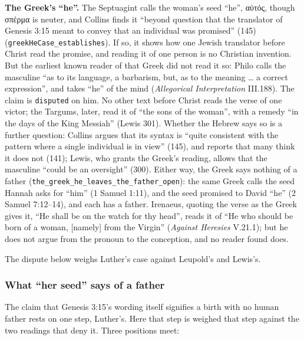 \documentclass[11pt]{article}
\begin{document}
\textbf{The Greek’s “he”.} The Septuagint calls the woman’s seed “he”, αὐτός, though σπέρμα is neuter, and Collins finds it “beyond question that the translator of Genesis 3:15 meant to convey that an individual was promised” (145) (\texttt{greek\allowbreak{}He\allowbreak{}Case\_\allowbreak{}establishes}). If so, it shows how one Jewish translator before Christ read the promise, and reading it of one person is no Christian invention. But the earliest known reader of that Greek did not read it so: Philo calls the masculine “as to its language, a barbarism, but, as to the meaning … a correct expression”, and takes “he” of the mind (\emph{Allegorical Interpretation} III.188). The claim is \texttt{disputed} on him. No other text before Christ reads the verse of one victor; the Targums, later, read it of “the sons of the woman”, with a remedy “in the days of the King Messiah” (Lewis 301). Whether the Hebrew says so is a further question: Collins argues that its syntax is “quite consistent with the pattern where a single individual is in view” (145), and reports that many think it does not (141); Lewis, who grants the Greek’s reading, allows that the masculine “could be an oversight” (300). Either way, the Greek says nothing of a father (\texttt{the\_\allowbreak{}greek\_\allowbreak{}he\_\allowbreak{}leaves\_\allowbreak{}the\_\allowbreak{}father\_\allowbreak{}open}): the same Greek calls the seed Hannah asks for “him” (1 Samuel 1:11), and the seed promised to David “he” (2 Samuel 7:12–14), and each has a father. Irenaeus, quoting the verse as the Greek gives it, “He shall be on the watch for thy head”, reads it of “He who should be born of a woman, [namely] from the Virgin” (\emph{Against Heresies} V.21.1); but he does not argue from the pronoun to the conception, and no reader found does.

The dispute below weighs Luther’s case against Leupold’s and Lewis’s.

\subsubsection*{What “her seed” says of a father}
The claim that Genesis 3:15’s wording itself signifies a birth with no human father rests on one step, Luther’s. Here that step is weighed that step against the two readings that deny it. Three positions meet:
\end{document}
